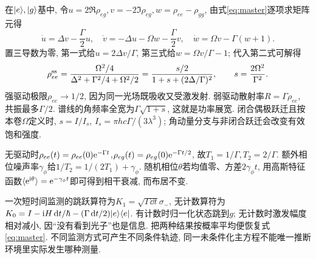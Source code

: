 在$\lvert e\rangle,\lvert g\rangle$基中, 令$u=2\Re\rho_{eg},v=-2\Im\rho_{eg},w=\rho_{ee}-\rho_{gg}$, 由式\eqref{eq:master}逐项求矩阵元得
\[\dot u=\Delta v-\frac\Gamma2u,\quad\dot v=-\Delta u-\Omega w-\frac\Gamma2v,\quad\dot w=\Omega v-\Gamma(w+1).\]
置三导数为零, 第一式给$u=2\Delta v/\Gamma$, 第三式给$w=\Omega v/\Gamma-1$; 代入第二式可解得
\begin{equation}\rho_{ee}^{\rm ss}=\frac{\Omega^2/4}{\Delta^2+\Gamma^2/4+\Omega^2/2}=\frac{s/2}{1+s+(2\Delta/\Gamma)^2},\qquad s=\frac{2\Omega^2}{\Gamma^2}.\label{eq:ss}\end{equation}
强驱动极限$\rho_{ee}\to1/2$, 因为同一光场既吸收又受激发射. 弱驱动散射率$R=\Gamma\rho_{ee}$, 共振最多$\Gamma/2$. 谱线的角频率全宽为$\Gamma\sqrt{1+s}$, 这就是功率展宽. 闭合偶极跃迁且按本卷$\Omega$定义时, $s=I/I_s$, $I_s=\pi hc\Gamma/(3\lambda^3)$; 角动量分支与非闭合跃迁会改变有效饱和强度.

无驱动时$\rho_{ee}(t)=\rho_{ee}(0)\mathrm e^{-\Gamma t}$,$\rho_{eg}(t)=\rho_{eg}(0)\mathrm e^{-\Gamma t/2}$, 故$T_1=1/\Gamma,T_2=2/\Gamma$. 额外相位噪声率$\gamma_\phi$给$1/T_2=1/(2T_1)+\gamma_\phi$. 随机相位$\theta$若均值零、方差$2\gamma_\phi t$, 用高斯特征函数$\langle\mathrm e^{\mathrm i\theta}\rangle=\mathrm e^{-\gamma_\phi t}$即可得到相干衰减, 而布居不变.

一次短时间监测的跳跃算符为$K_1=\sqrt{\Gamma\dd t}\sigma_-$, 无计数算符为$K_0=I-\mathrm i H\,\mathrm d t/\hbar-(\Gamma\,\mathrm d t/2)\lvert e\rangle\langle e\rvert$. 有计数时归一化状态跳到$g$; 无计数时激发幅度相对减小, 因“没有看到光子”也是信息. 把两种结果按概率平均便恢复式\eqref{eq:master}. 不同监测方式可产生不同条件轨迹, 同一未条件化主方程不能唯一推断环境里实际发生哪种测量.
